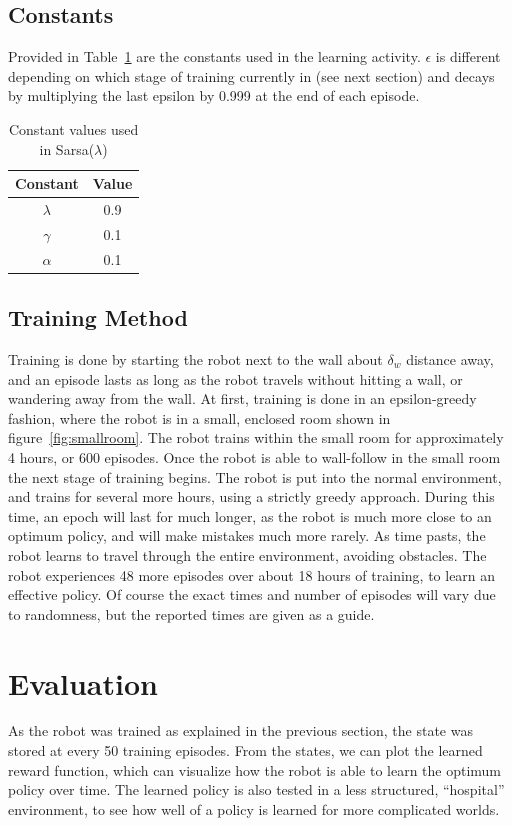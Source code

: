 \documentclass[letterpaper, 10 pt, conference]{ieeeconf}  %
\begin{document}
\subsection{Constants}
Provided in Table~\ref{Table:constants} are the constants used in the learning activity. 
$\epsilon$ is different depending on which stage of training currently in (see next section) and decays by multiplying the last epsilon by 0.999 at the end of each episode. 

\begin{table}
\centering
\caption{Constant values used in Sarsa($\lambda$)}
\label{Table:constants}
\begin{tabular}{|c|c|}
\hline
Constant & Value \\
\hline \hline
$\lambda$ & 0.9 \\
\hline 
$\gamma$ & 0.1 \\
\hline
$\alpha$ & 0.1 \\
\hline
\end{tabular}
\end{table}



\subsection{Training Method}
Training is done by starting the robot next to the wall about $\delta_w$ distance away, and an episode lasts as long as the robot travels without hitting a wall, or wandering away from the wall. 
At first, training is done in an epsilon-greedy fashion, where the robot is in a small, enclosed room shown in figure~\ref{fig:smallroom}. 
The robot trains within the small room for approximately 4 hours, or 600 episodes. 
Once the robot is able to wall-follow in the small room the next stage of training begins.
The robot is put into the normal environment, and trains for several more hours, using a strictly greedy approach. 
During this time, an epoch will last for much longer, as the robot is much more close to an optimum policy, and will make mistakes much more rarely. 
As time pasts, the robot learns to travel through the entire environment, avoiding obstacles. 
The robot experiences 48 more episodes over about 18 hours of training, to learn an effective policy. 
Of course the exact times and number of episodes will vary due to randomness, but the reported times are given as a guide. 

\section{Evaluation}
As the robot was trained as explained in the previous section, the state was stored at every 50 training episodes. 
From the states, we can plot the learned reward function, which can visualize how the robot is able to learn the optimum policy over time. 
The learned policy is also tested in a less structured, ``hospital'' environment, to see how well of a policy is learned for more complicated worlds. 
\end{document}
